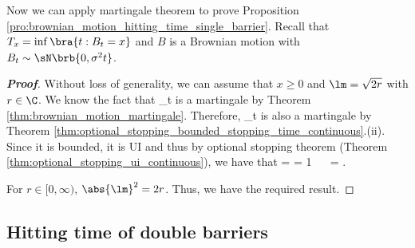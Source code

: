 Now we can apply martingale theorem to prove Proposition \ref{pro:brownian_motion_hitting_time_single_barrier}. Recall that $T_x = \inf\bra{t:B_t = x}$ and $B$ is a Brownian motion with $B_t \sim \sN\brb{0,\sigma^2 t}$.

\begin{proof}[\bf Proof]%

Without loss of generality, we can assume that $x\geq 0$ and $\lm = \sqrt{2r}$ with $r\in \C$. We know the fact that
\be
{}_{t}
\ee
is a martingale by Theorem \ref{thm:brownian_motion_martingale}. Therefore,
\be
{}_{t}
\ee
is also a martingale by Theorem \ref{thm:optional_stopping_bounded_stopping_time_continuous}.(ii). Since it is bounded, it is UI and thus by optional stopping theorem (Theorem \ref{thm:optional_stopping_ui_continuous}), we have that
\be
\E{} = \E{} = 1  \ \ra \ \exp{} = \E{}.
\ee

For $r\in [0,\infty)$, $\abs{\lm}^2 = 2r$. Thus, we have the required result.%
\end{proof}

\subsection{Hitting time of double barriers}

